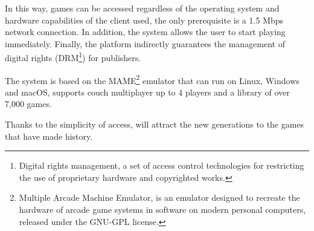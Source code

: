 In this way, games can be accessed regardless of the operating system and hardware capabilities of the client used, the only prerequisite is a 1.5 Mbps network connection. In addition, the system allows the user to start playing immediately. Finally, the platform indirectly guarantees the management of digital rights (DRM\footnote{Digital rights management, a set of access control technologies for restricting the use of proprietary hardware and copyrighted works.}) for publishers.

The system is based on the MAME\footnote{Multiple Arcade Machine Emulator, is an emulator designed to recreate the hardware of arcade game systems in software on modern personal computers, released under the GNU-GPL license.} emulator that can run on Linux, Windows and macOS, supports couch multiplayer up to 4 players and a library of over 7,000 games.

Thanks to the simplicity of access, will attract the new generations to the games that have made history.